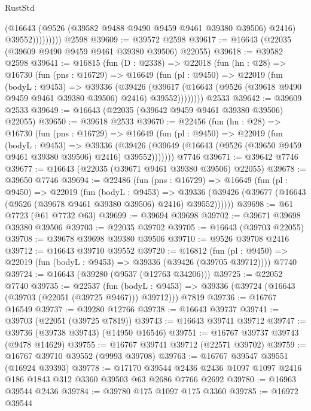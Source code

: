 \begin{lexlean}{RustStd}
\begin{coremodule}
                    (@16643
                      (@9526 (@39582 @9488 @9490 @9459 @9461 @39380 @39506) @2416)
                      @39552)))))))))
    @2598
@39609 := @39572 @2598
@39617 := @16643 (@22035 (@39609 @9490 @9459 @9461 @39380 @39506) @22055)
@39618 := @39582 @2598
@39641 := @16815
    (fun (D : @2338) =>
    @22018
      (fun (hn : @28) =>
      @16730
        (fun (pns : @16729) =>
        @16649
          (fun (pl : @9450) =>
          @22019
            (fun (bodyL : @9453) =>
            @39336
              (@39426
                (@39617
                  (@16643 (@9526 (@39618 @9490 @9459 @9461 @39380 @39506) @2416) @39552))))))))
    @2533
@39642 := @39609 @2533
@39649 := @16643 (@22035 (@39642 @9459 @9461 @39380 @39506) @22055)
@39650 := @39618 @2533
@39670 := @22456
    (fun (hn : @28) =>
    @16730
      (fun (pns : @16729) =>
      @16649
        (fun (pl : @9450) =>
        @22019
          (fun (bodyL : @9453) =>
          @39336
            (@39426 (@39649 (@16643 (@9526 (@39650 @9459 @9461 @39380 @39506) @2416) @39552)))))))
    @7746
@39671 := @39642 @7746
@39677 := @16643 (@22035 (@39671 @9461 @39380 @39506) @22055)
@39678 := @39650 @7746
@39694 := @22486
    (fun (pns : @16729) =>
    @16649
      (fun (pl : @9450) =>
      @22019
        (fun (bodyL : @9453) =>
        @39336 (@39426 (@39677 (@16643 (@9526 (@39678 @9461 @39380 @39506) @2416) @39552))))))
@39698 := @61 @7723 (@61 @7732 @63)
@39699 := @39694 @39698
@39702 := @39671 @39698 @39380 @39506
@39703 := @22035 @39702
@39705 := @16643 (@39703 @22055)
@39708 := @39678 @39698 @39380 @39506
@39710 := @9526 @39708 @2416
@39712 := @16643 @39710 @39552
@39720 := @16812
    (fun (pl : @9450) => @22019 (fun (bodyL : @9453) => @39336 (@39426 (@39705 @39712))))
    @7740
@39724 := @16643 (@39280 (@9537 (@12763 @34206)))
@39725 := @22052 @7740
@39735 := @22537
    (fun (bodyL : @9453) => @39336 (@39724 (@16643 (@39703 (@22051 (@39725 @9467))) @39712)))
    @7819
@39736 := @16767 @16549
@39737 := @39280 @12766
@39738 := @16643 @39737
@39741 := @39703 (@22051 (@39725 @7819))
@39743 := @16643 @39741 @39712
@39747 := @39736 (@39738 @39743) (@14950 @16546)
@39751 := @16767 @39737 @39743 (@9478 @14629)
@39755 := @16767 @39741 @39712 (@22571 @39702)
@39759 := @16767 @39710 @39552 (@9993 @39708)
@39763 := @16767 @39547 @39551 (@16924 @39393)
@39778 := @17170
    @39544
    @2436
    @2436
    @1097
    @1097
    @2416
    @186
    @1843
    @312
    @3360
    @39503
    @63
    @2686
    @7766
    @2692
@39780 := @16963 @39544 @2436
@39784 := @39780 @175 @1097 @175 @3360
@39785 := @16972 @39544

\end{coremodule}
\end{lexlean}
